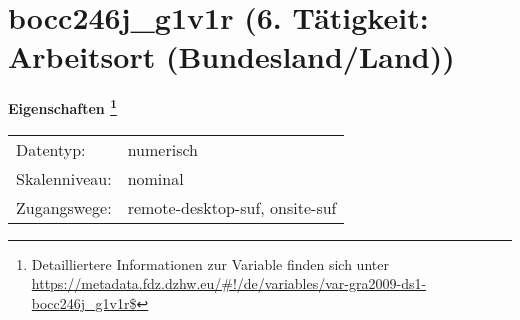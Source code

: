 
    \setcounter{footnote}{0}

    \vspace*{-1.8cm}
	\section{bocc246j\_g1v1r (6. Tätigkeit: Arbeitsort (Bundesland/Land))}
	\label{section:bocc246j_g1v1r}



    \vspace*{0.5cm}
    \noindent\textbf{Eigenschaften
	\footnote{Detailliertere Informationen zur Variable finden sich unter
		\url{https://metadata.fdz.dzhw.eu/\#!/de/variables/var-gra2009-ds1-bocc246j_g1v1r$}}}\\
	\begin{tabularx}{\hsize}{@{}lX}
	Datentyp: & numerisch \\
	Skalenniveau: & nominal \\
	Zugangswege: &
	  remote-desktop-suf, 
	  onsite-suf
 \\
    \end{tabularx}



